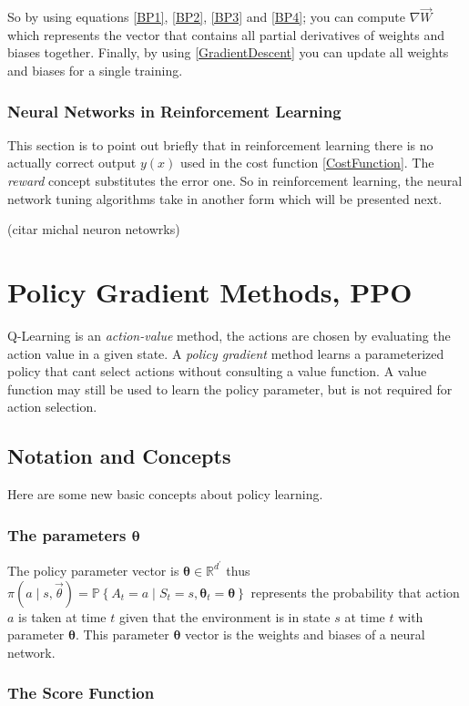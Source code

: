  So by using equations \ref{BP1}, \ref{BP2}, \ref{BP3} and \ref{BP4}; you can compute $\nabla\vec{W}$ which represents the vector that contains all  partial derivatives of weights and biases together. Finally, by using \ref{GradientDescent} you can update all weights and biases for a single training.
 
 \subsubsection{Neural Networks in Reinforcement Learning}
 This section is to point out briefly that in reinforcement learning there is no actually correct output $y\left(x\right)$ used in the cost function \ref{CostFunction}. The \textit{reward} concept substitutes the error one. So in reinforcement learning, the neural network tuning algorithms  take in another form which will be presented next.
 
 (citar michal neuron netowrks)
 
 \section{Policy Gradient Methods, PPO}
 
 Q-Learning is an \textit{action-value} method, the actions are chosen by evaluating the action value in a given state. A \textit{policy gradient} method learns a parameterized policy that cant select actions without consulting a value function.
 A value function may still be used to learn the policy parameter, but is not required for action selection.
 
 \subsection{Notation and Concepts}
 Here are some new basic concepts about policy learning.
 \subsubsection{The parameters $\bm{\theta}$}
 The policy parameter vector is $\bm{\theta} \in \mathbb{R}^{d^\prime}$ thus $\pi\left(a\mid s,\vec{\theta}\right) = \mathbb{P}\left\{A_t = a\mid S_t = s, \bm{\theta}_t = \bm{\theta}\right\}$ represents the probability that action $a$ is taken at time $t$ given that the environment is in state $s$ at time $t$ with parameter $\bm{\theta}$. This parameter $\bm{\theta}$  vector is the weights and biases of a neural network.
 
 \subsubsection{The Score Function}
 
